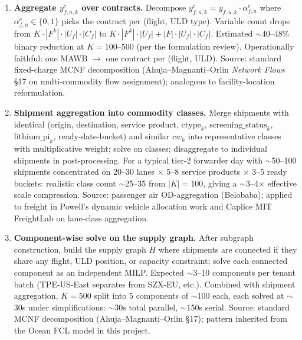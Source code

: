 \documentclass[11pt,a4paper]{article}
\newcommand{\ctype}{\text{ctype}}
\theoremstyle{definition}
\begin{document}
\begin{enumerate}
  \item \label{item:scale-y-aggregation} \textbf{Aggregate $y_{f,u,k}^c$ over contracts.}
        Decompose $y_{f,u,k}^c = y_{f,u,k} \cdot \alpha_{f,u}^c$ where $\alpha_{f,u}^c \in \{0,1\}$
        picks the contract per (flight, ULD type). Variable count drops from
        $K \cdot |F^k| \cdot |U_f| \cdot |C_f|$ to $K \cdot |F^k| \cdot |U_f| + |F| \cdot |U_f| \cdot |C_f|$.
        Estimated $\sim$40--48\% binary reduction at $K=100$--$500$ (per the formulation
        review). Operationally faithful: one MAWB $\to$ one contract per (flight, ULD).
        Source: standard fixed-charge MCNF decomposition (Ahuja--Magnanti--Orlin \emph{Network Flows}
        \S17 on multi-commodity flow assignment); analogous to facility-location reformulation.

  \item \label{item:scale-shipment-aggregation} \textbf{Shipment aggregation into commodity classes.}
        Merge shipments with identical (origin, destination, service product, $\ctype_k$,
        $\text{screening\_status}_k$, $\text{lithium\_pi}_k$, ready-date-bucket) and similar
        $cw_k$ into representative classes with multiplicative weight; solve on classes;
        disaggregate to individual shipments in post-processing. For a typical tier-2
        forwarder day with $\sim$50--100 shipments concentrated on 20--30 lanes $\times$
        5--8 service products $\times$ 3--5 ready buckets: realistic class count
        $\sim$25--35 from $|K|=100$, giving a $\sim$3--4$\times$ effective scale
        compression. Source: passenger air OD-aggregation (Belobaba); applied to freight
        in Powell's dynamic vehicle allocation work and Caplice MIT FreightLab on lane-class
        aggregation.

  \item \label{item:scale-component-decomposition} \textbf{Component-wise solve on the supply graph.}
        After subgraph construction, build the supply graph $H$ where shipments are
        connected if they share any flight, ULD position, or capacity constraint; solve
        each connected component as an independent MILP. Expected $\sim$3--10 components
        per tenant batch (TPE-US-East separates from SZX-EU, etc.). Combined with shipment
        aggregation, $K=500$ split into 5 components of $\sim$100 each, each solved at
        $\sim$30s under simplifications: $\sim$30s total parallel, $\sim$150s serial.
        Source: standard MCNF decomposition (Ahuja--Magnanti--Orlin \S17); pattern
        inherited from the Ocean FCL model in this project.


\end{enumerate}
\end{document}
